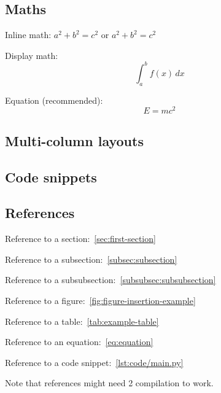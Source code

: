 \subsection{Maths}\label{subsec:maths}
Inline math: \( a^2 + b^2 = c^2 \) or $ a^2 + b^2 = c^2 $

Display math:
\[
    \int_{a}^{b} f(x) \, dx
\]

Equation (recommended):
\begin{equation}
    E = mc^2\label{eq:equation}
\end{equation}

\subsection{Multi-column layouts}\label{subsec:multi-column-layouts}
\begin{multicols}{2}
    \lipsum[1]
\end{multicols}

\subsection{Code snippets}\label{subsec:code-snippets}


\subsection{References}\label{subsec:references}
Reference to a section:~\ref{sec:first-section}

Reference to a subsection:~\ref{subsec:subsection}

Reference to a subsubsection:~\ref{subsubsec:subsubsection}

Reference to a figure:~\ref{fig:figure-insertion-example}

Reference to a table:~\ref{tab:example-table}

Reference to an equation:~\eqref{eq:equation}

Reference to a code snippet:~\ref{lst:code/main.py}

Note that references might need 2 compilation to work.